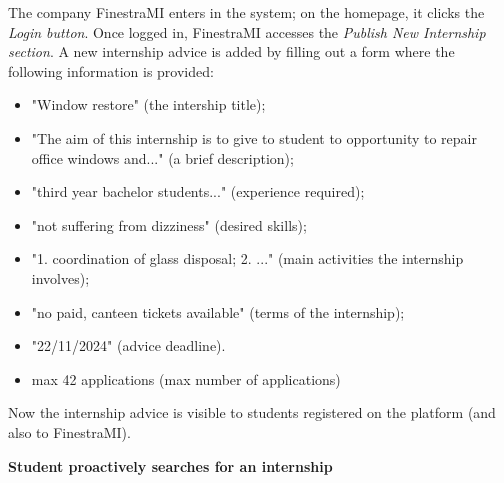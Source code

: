 			\begin{flushleft}
				The company FinestraMI enters in the system; on the homepage, it clicks the \emph{Login button}. Once logged in, FinestraMI accesses the \emph{Publish New Internship section}. A new internship advice is added by filling out a form where the following information is provided:
				\begin{itemize}
					\item "Window restore" (the intership title);
					\item "The aim of this internship is to give to student to opportunity to repair office windows and..." (a brief description);
					\item "third year bachelor students..." (experience required);
					\item "not suffering from dizziness" (desired skills);
					\item "1. coordination of glass disposal; 2. ..." (main activities the internship involves);
					\item "no paid, canteen tickets available" (terms of the internship);
					\item "22/11/2024" (advice deadline).
					\item max 42 applications (max number of applications)				
					\end{itemize}
				
				Now the internship advice is visible to students registered on the platform (and also to FinestraMI).
			\end{flushleft}
			\textbf{Student proactively searches for an internship}
